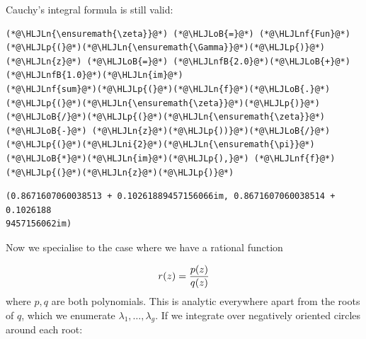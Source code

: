\documentclass[12pt,a4paper]{article}
\newcommand{\HLJLn}[1]{#1}
\newcommand{\HLJLnf}[1]{\textcolor[RGB]{66,102,213}{#1}}
\newcommand{\HLJLnfB}[1]{\textcolor[RGB]{59,151,46}{#1}}
\newcommand{\HLJLni}[1]{\textcolor[RGB]{59,151,46}{#1}}
\newcommand{\HLJLoB}[1]{\textcolor[RGB]{102,102,102}{\textbf{#1}}}
\newcommand{\HLJLp}[1]{#1}
\begin{document}
Cauchy's integral formula is still valid:


\begin{lstlisting}
(*@\HLJLn{\ensuremath{\zeta}}@*) (*@\HLJLoB{=}@*) (*@\HLJLnf{Fun}@*)(*@\HLJLp{(}@*)(*@\HLJLn{\ensuremath{\Gamma}}@*)(*@\HLJLp{)}@*)
(*@\HLJLn{z}@*) (*@\HLJLoB{=}@*) (*@\HLJLnfB{2.0}@*)(*@\HLJLoB{+}@*)(*@\HLJLnfB{1.0}@*)(*@\HLJLn{im}@*)
(*@\HLJLnf{sum}@*)(*@\HLJLp{(}@*)(*@\HLJLn{f}@*)(*@\HLJLoB{.}@*)(*@\HLJLp{(}@*)(*@\HLJLn{\ensuremath{\zeta}}@*)(*@\HLJLp{)}@*)(*@\HLJLoB{/}@*)(*@\HLJLp{(}@*)(*@\HLJLn{\ensuremath{\zeta}}@*) (*@\HLJLoB{-}@*) (*@\HLJLn{z}@*)(*@\HLJLp{))}@*)(*@\HLJLoB{/}@*)(*@\HLJLp{(}@*)(*@\HLJLni{2}@*)(*@\HLJLn{\ensuremath{\pi}}@*)(*@\HLJLoB{*}@*)(*@\HLJLn{im}@*)(*@\HLJLp{),}@*) (*@\HLJLnf{f}@*)(*@\HLJLp{(}@*)(*@\HLJLn{z}@*)(*@\HLJLp{)}@*)
\end{lstlisting}

\begin{lstlisting}
(0.8671607060038513 + 0.10261889457156066im, 0.8671607060038514 + 0.1026188
9457156062im)
\end{lstlisting}


Now we specialise to the case where we have a rational function 

\[
r(z) = {p(z) \over q(z)}
\]
where $p,q$ are both polynomials. This is analytic everywhere apart from the roots  of $q$, which we enumerate $\lambda_1,\ldots,\lambda_g$.   If we integrate over negatively oriented circles  around each root:
\end{document}
